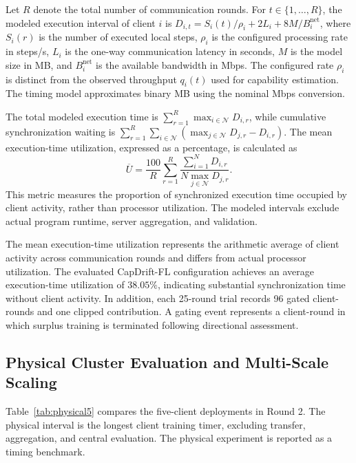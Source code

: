 \documentclass[conference]{IEEEtran}
\begin{document}
Let $R$ denote the total number of communication rounds.
For $t\in\{1,\ldots,R\}$, the modeled execution interval
of client $i$ is $D_{i,t}=S_i(t)/\rho_i+2L_i+8M/B_i^{\mathrm{net}}$, where $S_i(r)$ is the number of executed local steps, $\rho_i$ is the configured processing rate in steps/s, $L_i$ is the one-way communication latency in seconds, $M$ is the model size in MB, and $B_i^{\mathrm{net}}$ is the available bandwidth in Mbps. The configured rate $\rho_i$ is distinct from the observed throughput $q_i(t)$ used for capability estimation. The timing model approximates binary MB using the nominal Mbps conversion.

The total modeled execution time is
$\sum_{r=1}^{R}\max_{i\in\mathcal{N}}D_{i,r}$, while cumulative synchronization waiting is $\sum_{r=1}^{R}\sum_{i\in\mathcal{N}}
(\max_{j\in\mathcal{N}}D_{j,r}-D_{i,r})$.
The mean execution-time utilization,
expressed as a percentage, is calculated as
\begin{equation}
\overline U=\frac{100}{R}
\sum_{r=1}^{R}
\frac{\sum_{i=1}^{N}D_{i,r}}
{N\max_{j\in\mathcal{N}}D_{j,r}}.
\label{eq:util_mean}
\end{equation}
This metric measures the proportion of
synchronized execution time occupied by
client activity, rather than processor
utilization. The modeled intervals exclude actual program runtime, server aggregation, and validation.

The mean execution-time utilization represents the arithmetic average of client activity across communication rounds and differs from actual processor utilization. The evaluated CapDrift-FL configuration achieves an average execution-time utilization of $38.05\%$, indicating substantial synchronization time without client activity. In addition, each 25-round trial records 96 gated client-rounds and one clipped contribution. A gating event represents a client-round in which surplus training is terminated following directional assessment.

\subsection{Physical Cluster Evaluation and Multi-Scale Scaling}\label{subsec:physical}
Table~\ref{tab:physical5} compares the five-client deployments in Round 2. The physical interval is the longest client training timer, excluding transfer, aggregation, and central evaluation. The physical experiment is reported as a timing benchmark.
 
\end{document}
